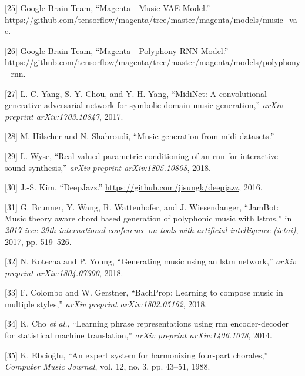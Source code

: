 \documentclass[12pt,]{article}
\begin{document}
\leavevmode\hypertarget{ref-magentavae}{}%
{[}25{]} \relax Google Brain Team, ``Magenta - Music VAE Model.'' \\
\url{https://github.com/tensorflow/magenta/tree/master/magenta/models/music_vae}.

\leavevmode\hypertarget{ref-magentapolyphony}{}%
{[}26{]} \relax Google Brain Team, ``Magenta - Polyphony RNN Model.'' \\
\url{https://github.com/tensorflow/magenta/tree/master/magenta/models/polyphony_rnn}.

\leavevmode\hypertarget{ref-yang2017midinet}{}%
{[}27{]} L.-C. Yang, S.-Y. Chou, and Y.-H. Yang, ``MidiNet: A
convolutional generative adversarial network for symbolic-domain music
generation,'' \emph{arXiv preprint arXiv:1703.10847}, 2017.

\leavevmode\hypertarget{ref-hilschermusic}{}%
{[}28{]} M. Hilscher and N. Shahroudi, ``Music generation from midi
datasets.''

\leavevmode\hypertarget{ref-wyse2018real}{}%
{[}29{]} L. Wyse, ``Real-valued parametric conditioning of an rnn for
interactive sound synthesis,'' \emph{arXiv preprint arXiv:1805.10808},
2018.

\leavevmode\hypertarget{ref-kim2016deepjazz}{}%
{[}30{]} J.-S. Kim, ``DeepJazz.''
\url{https://github.com/jisungk/deepjazz}, 2016.

\leavevmode\hypertarget{ref-brunner2017jambot}{}%
{[}31{]} G. Brunner, Y. Wang, R. Wattenhofer, and J. Wiesendanger,
``JamBot: Music theory aware chord based generation of polyphonic music
with lstms,'' in \emph{2017 ieee 29th international conference on tools
with artificial intelligence (ictai)}, 2017, pp. 519--526.

\leavevmode\hypertarget{ref-kotecha2018generating}{}%
{[}32{]} N. Kotecha and P. Young, ``Generating music using an lstm
network,'' \emph{arXiv preprint arXiv:1804.07300}, 2018.

\leavevmode\hypertarget{ref-colombo2018bachprop}{}%
{[}33{]} F. Colombo and W. Gerstner, ``BachProp: Learning to compose
music in multiple styles,'' \emph{arXiv preprint arXiv:1802.05162},
2018.

\leavevmode\hypertarget{ref-cho2014learning}{}%
{[}34{]} K. Cho \emph{et al.}, ``Learning phrase representations using
rnn encoder-decoder for statistical machine translation,'' \emph{arXiv
preprint arXiv:1406.1078}, 2014.

\leavevmode\hypertarget{ref-ebciouglu1988expert}{}%
{[}35{]} K. Ebcioğlu, ``An expert system for harmonizing four-part
chorales,'' \emph{Computer Music Journal}, vol. 12, no. 3, pp. 43--51,
1988.
\end{document}
